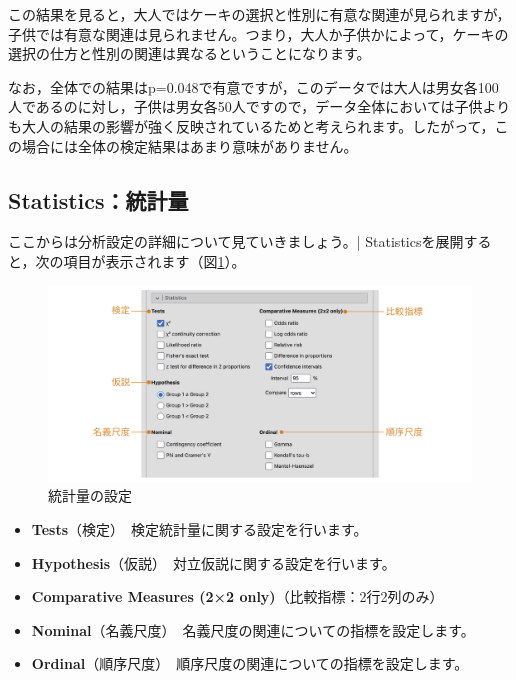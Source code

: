 \documentclass[
  12pt,
  a5jpaper,
  lualatex, ja=standard]{bxjsbook}
\providecommand{\tightlist}{%
  \setlength{\itemsep}{0pt}\setlength{\parskip}{0pt}}
\newenvironment{jmvsettings}{%
	\begin{center}%
	\begin{tcolorbox}[%
		title=設定項目,
		colframe=gmoji,
		colbacktitle=gmoji,
		colback=gmoji!2!white,
		breakable,
		width=.9\textwidth,
		]\small\addtolength{\leftmargini}{-3\labelsep}%
	}%
	{\end{tcolorbox}\end{center}}
\begin{document}
この結果を見ると，大人ではケーキの選択と性別に有意な関連が見られますが，子供では有意な関連は見られません。つまり，大人か子供かによって，ケーキの選択の仕方と性別の関連は異なるということになります。

なお，全体での結果はp=0.048で有意ですが，このデータでは大人は男女各100人であるのに対し，子供は男女各50人ですので，データ全体においては子供よりも大人の結果の影響が強く反映されているためと考えられます。したがって，この場合には全体の検定結果はあまり意味がありません。

\clearpage

\hypertarget{sub:frequencies-chisq-statistics}{%
\subsection{Statistics：統計量}\label{sub:frequencies-chisq-statistics}}

ここからは分析設定の詳細について見ていきましょう。\colorbox{bar}{\textcolor{gmoji2}{| Statistics}}を展開すると，次の項目が表示されます（図\ref{fig:frequencies-chisq-statistics}）。

\begin{figure}[!ht]

{\centering \includegraphics[width=1\linewidth]{images/frequencies/chisq-statistics} 

}

\caption{統計量の設定}\label{fig:frequencies-chisq-statistics}
\end{figure}

\begin{jmvsettings}

\begin{itemize}
\tightlist
\item
  \textbf{Tests}（検定）　検定統計量に関する設定を行います。
\item
  \textbf{Hypothesis}（仮説）　対立仮説に関する設定を行います。
\item
  \textbf{Comparative Measures (2×2 only)}（比較指標：2行2列のみ）
\item
  \textbf{Nominal}（名義尺度）　名義尺度の関連についての指標を設定します。
\item
  \textbf{Ordinal}（順序尺度）　順序尺度の関連についての指標を設定します。
\end{itemize}

\end{jmvsettings}
\end{document}
